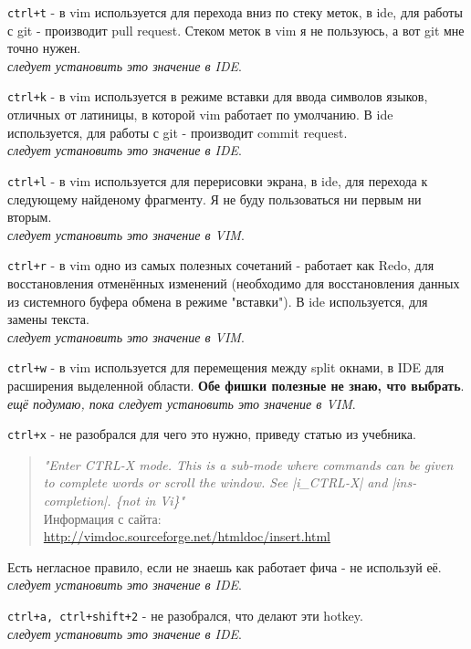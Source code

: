 \documentclass[a4paper, 12pt]{report}
\begin{document}
\begin{list}{*}{}
	\item \lstinline|ctrl+t| - в vim используется для перехода вниз по стеку меток, в ide, для работы с git - производит pull request. Стеком меток в vim я не пользуюсь, а вот git мне точно нужен.\\ \textit{следует установить это значение в IDE}.
	\item \lstinline|ctrl+k| - в vim используется в режиме вставки для ввода символов языков, отличных от латиницы, в которой vim работает по умолчанию. В ide используется, для работы с git - производит commit request.\\ \textit{следует установить это значение в IDE}.
	\item \lstinline|ctrl+l| - в vim используется для перерисовки экрана, в ide, для перехода к следующему найденому фрагменту. Я не буду пользоваться ни первым ни вторым.\\ \textit{следует установить это значение в VIM}.
	\item \lstinline|ctrl+r| - в vim одно из самых полезных сочетаний - работает как Redo, для восстановления отменённых изменений (необходимо для восстановления данных из системного буфера обмена в режиме "вставки"). В ide используется, для замены текста.\\ \textit{следует установить это значение в VIM}.
	\item \lstinline|ctrl+w| - в vim используется для перемещения между split окнами, в IDE для расширения выделенной области. \textbf{Обе фишки полезные не знаю, что выбрать}.\\ \textit{ещё подумаю, пока следует установить это значение в VIM}.
	\item \lstinline|ctrl+x| - не разобрался для чего это нужно, приведу статью из учебника.
	\begin{quotation}\textit{"Enter CTRL-X mode.  This is a sub-mode where commands can	be given to complete words or scroll the window. See |i\_CTRL-X| and |ins-completion|. \{not in Vi\}"}\\
	Информация с сайта:\\ \href{http://vimdoc.sourceforge.net/htmldoc/insert.html}{http://vimdoc.sourceforge.net/htmldoc/insert.html}
	\end{quotation}
	Есть негласное правило, если не знаешь как работает фича - не используй её. \textit{следует установить это значение в IDE}.
	\item \lstinline|ctrl+a, ctrl+shift+2| - не разобрался, что делают эти hotkey.\\ \textit{следует установить это значение в IDE}.

\end{list}
\end{document}
